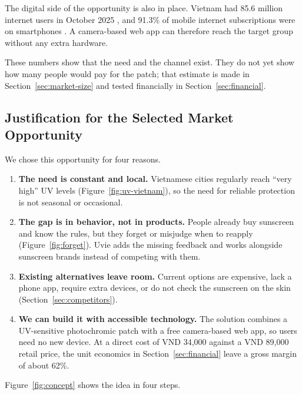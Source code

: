 The digital side of the opportunity is also in place. Vietnam had 85.6 million
internet users in October 2025 \cite{datareportal2026}, and 91.3\% of mobile
internet subscriptions were on smartphones \cite{vnnews2026}. A camera-based web
app can therefore reach the target group without any extra hardware.

These numbers show that the need and the channel exist. They do not yet show how
many people would pay for the patch; that estimate is made in
Section~\ref{sec:market-size} and tested financially in Section~\ref{sec:financial}.

\subsection{Justification for the Selected Market Opportunity}
We chose this opportunity for four reasons.

\begin{enumerate}[itemsep=0pt]
  \item \textbf{The need is constant and local.} Vietnamese cities regularly reach
    ``very high'' UV levels (Figure~\ref{fig:uv-vietnam}), so the need for reliable
    protection is not seasonal or occasional.
  \item \textbf{The gap is in behavior, not in products.} People already buy
    sunscreen and know the rules, but they forget or misjudge when to reapply
    (Figure~\ref{fig:forget}). Uvie adds the missing feedback and works alongside
    sunscreen brands instead of competing with them.
  \item \textbf{Existing alternatives leave room.} Current options are expensive,
    lack a phone app, require extra devices, or do not check the sunscreen on the
    skin (Section~\ref{sec:competitors}).
  \item \textbf{We can build it with accessible technology.} The solution combines
    a UV-sensitive photochromic patch with a free camera-based web app, so users
    need no new device. At a direct cost of VND 34,000 against a VND 89,000 retail
    price, the unit economics in Section~\ref{sec:financial} leave a gross margin of
    about 62\%.
\end{enumerate}

Figure~\ref{fig:concept} shows the idea in four steps.


